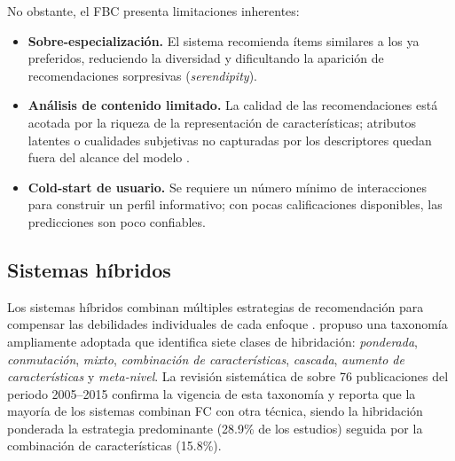 No obstante, el FBC presenta limitaciones inherentes:
\begin{itemize}
	\item \textbf{Sobre-especialización.} El sistema recomienda ítems similares a los ya preferidos, reduciendo la diversidad y dificultando la aparición de recomendaciones sorpresivas (\textit{serendipity}).
	\item \textbf{Análisis de contenido limitado.} La calidad de las recomendaciones está acotada por la riqueza de la representación de características; atributos latentes o cualidades subjetivas no capturadas por los descriptores quedan fuera del alcance del modelo \citep{aggarwal_recommender_2016}.
	\item \textbf{Cold-start de usuario.} Se requiere un número mínimo de interacciones para construir un perfil informativo; con pocas calificaciones disponibles, las predicciones son poco confiables.
\end{itemize}

\subsection{Sistemas híbridos} \label{subsec:hybrid}

Los sistemas híbridos combinan múltiples estrategias de recomendación para compensar las debilidades individuales de cada enfoque \citep{raza_comprehensive_2025, sarkar_tourism_2023}. \citep{burke_hybrid_2002} propuso una taxonomía ampliamente adoptada que identifica siete clases de hibridación: \textit{ponderada}, \textit{conmutación}, \textit{mixto}, \textit{combinación de características}, \textit{cascada}, \textit{aumento de características} y \textit{meta-nivel}. La revisión sistemática de \citet{cano_hybrid_2019} sobre 76 publicaciones del periodo 2005--2015 confirma la vigencia de esta taxonomía y reporta que la mayoría de los sistemas combinan FC con otra técnica, siendo la hibridación ponderada la estrategia predominante (28.9\% de los estudios) seguida por la combinación de características (15.8\%).

